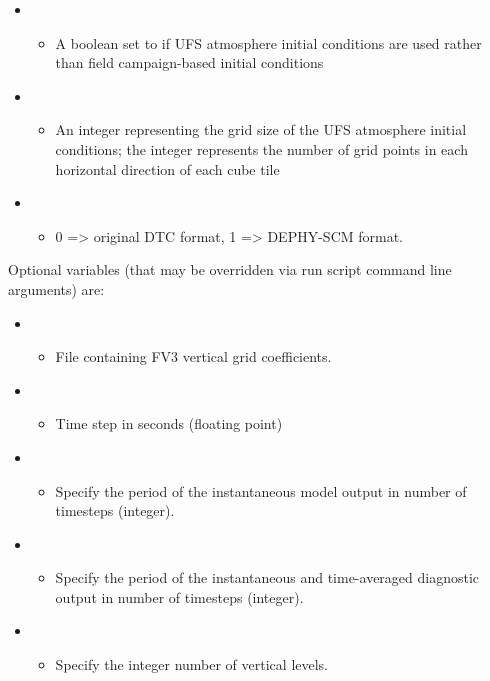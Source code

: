 \begin{itemize}
\begin{itemize}
	\end{itemize}
\item {}
	\begin{itemize}
	\item A boolean set to  if UFS atmosphere initial conditions are used rather than field campaign-based initial conditions
	\end{itemize}
\item {}
	\begin{itemize}
	\item An integer representing the grid size of the UFS atmosphere initial conditions; the integer represents the number of grid points in each horizontal direction of each cube tile
	\end{itemize}
\item {}
        \begin{itemize}
        \item  0 => original DTC format, 1 => DEPHY-SCM format.
        \end{itemize}
\end{itemize}

Optional variables (that may be overridden via run script command line arguments) are:
\begin{itemize}
\item {}
        \begin{itemize}
          \item File containing FV3 vertical grid coefficients.
        \end{itemize}
\item {}
	\begin{itemize}
	\item Time step in seconds (floating point)
	\end{itemize}
\item {}
	\begin{itemize}
	\item Specify the period of the instantaneous model output in number of timesteps (integer). 
	\end{itemize}
\item {}
	\begin{itemize}
	\item Specify the period of the instantaneous and time-averaged diagnostic output in number of timesteps (integer). 
	\end{itemize}
\item {}
	\begin{itemize}
	\item Specify the integer number of vertical levels.
	\end{itemize}
\end{itemize}

